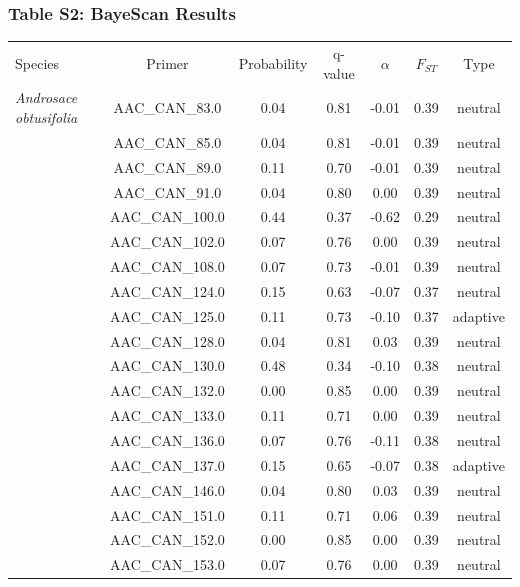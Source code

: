 \documentclass[11pt,]{article}
\begin{document}
\subsubsection{Table S2: BayeScan
Results}\label{table-s2-bayescan-results}

\begin{longtable}[c]{@{}lcccccc@{}}
\toprule\addlinespace
Species & Primer & Probability & q-value & $\alpha$ & $F_{ST}$ & Type
\\\addlinespace
\midrule\endhead
\textit{Androsace obtusifolia} & AAC\_CAN\_83.0 & 0.04 & 0.81 & -0.01 &
0.39 & neutral
\\\addlinespace
& AAC\_CAN\_85.0 & 0.04 & 0.81 & -0.01 & 0.39 & neutral
\\\addlinespace
& AAC\_CAN\_89.0 & 0.11 & 0.70 & -0.01 & 0.39 & neutral
\\\addlinespace
& AAC\_CAN\_91.0 & 0.04 & 0.80 & 0.00 & 0.39 & neutral
\\\addlinespace
& AAC\_CAN\_100.0 & 0.44 & 0.37 & -0.62 & 0.29 & neutral
\\\addlinespace
& AAC\_CAN\_102.0 & 0.07 & 0.76 & 0.00 & 0.39 & neutral
\\\addlinespace
& AAC\_CAN\_108.0 & 0.07 & 0.73 & -0.01 & 0.39 & neutral
\\\addlinespace
& AAC\_CAN\_124.0 & 0.15 & 0.63 & -0.07 & 0.37 & neutral
\\\addlinespace
& AAC\_CAN\_125.0 & 0.11 & 0.73 & -0.10 & 0.37 & adaptive
\\\addlinespace
& AAC\_CAN\_128.0 & 0.04 & 0.81 & 0.03 & 0.39 & neutral
\\\addlinespace
& AAC\_CAN\_130.0 & 0.48 & 0.34 & -0.10 & 0.38 & neutral
\\\addlinespace
& AAC\_CAN\_132.0 & 0.00 & 0.85 & 0.00 & 0.39 & neutral
\\\addlinespace
& AAC\_CAN\_133.0 & 0.11 & 0.71 & 0.00 & 0.39 & neutral
\\\addlinespace
& AAC\_CAN\_136.0 & 0.07 & 0.76 & -0.11 & 0.38 & neutral
\\\addlinespace
& AAC\_CAN\_137.0 & 0.15 & 0.65 & -0.07 & 0.38 & adaptive
\\\addlinespace
& AAC\_CAN\_146.0 & 0.04 & 0.80 & 0.03 & 0.39 & neutral
\\\addlinespace
& AAC\_CAN\_151.0 & 0.11 & 0.71 & 0.06 & 0.39 & neutral
\\\addlinespace
& AAC\_CAN\_152.0 & 0.00 & 0.85 & 0.00 & 0.39 & neutral
\\\addlinespace
& AAC\_CAN\_153.0 & 0.07 & 0.76 & 0.00 & 0.39 & neutral

\end{longtable}
\end{document}
